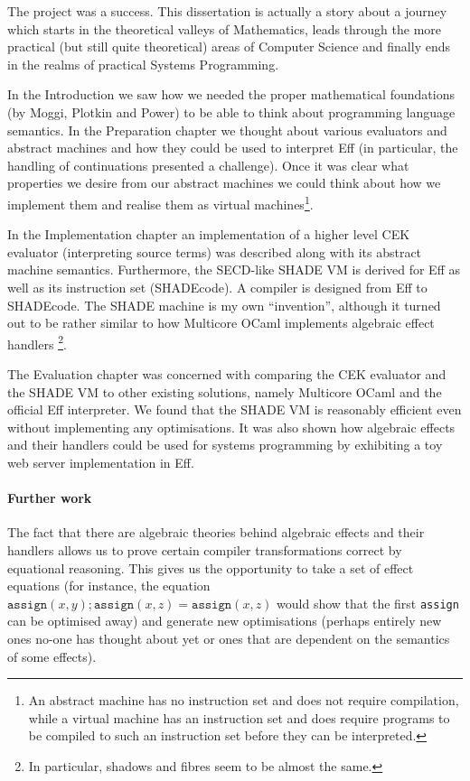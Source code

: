 \documentclass[class=article, crop=false]{standalone}
\begin{document}

The project was a success. This dissertation is actually a story about a journey
which starts in the theoretical valleys of Mathematics, leads through the more
practical (but still quite theoretical) areas of Computer Science and finally
ends in the realms of practical Systems Programming.

In the Introduction we saw how we needed the proper mathematical foundations
(by Moggi, Plotkin and Power) to be able to think about programming language
semantics. In the Preparation chapter we thought about various evaluators and
abstract machines and how they could be used to interpret Eff (in particular,
the handling of continuations presented a challenge). Once it was clear what
properties we desire from our abstract machines we could think about how we
implement them and realise them as virtual machines\footnote{An abstract machine
has no instruction set and does not require compilation, while a virtual machine
has an instruction set and does require programs to be compiled to such an
instruction set before they can be interpreted.}.

In the Implementation chapter an implementation of a higher level CEK evaluator
(interpreting source terms) was described along with its abstract machine
semantics. Furthermore, the SECD-like SHADE VM is derived for Eff as well as
its instruction set (SHADEcode). A compiler is designed from Eff to SHADEcode.
The SHADE machine is my own ``invention'', although it turned out to be rather
similar to how Multicore OCaml implements algebraic effect handlers
\footnote{In particular, shadows and fibres seem to be almost the same.}.

The Evaluation chapter was concerned with comparing the CEK evaluator and the
SHADE VM to other existing solutions, namely Multicore OCaml and the official
Eff interpreter. We found that the SHADE VM is reasonably efficient even without
implementing any optimisations. It was also shown how algebraic effects and
their handlers could be used for systems programming by exhibiting a toy web
server implementation in Eff.

\paragraph{Further work}

The fact that there are algebraic theories behind algebraic effects and their
handlers allows us to prove certain compiler transformations correct by
equational reasoning. This gives us the opportunity to take a set of effect
equations (for instance, the equation $\mathtt{assign}(x,y); \mathtt{assign}(x,z) =
\mathtt{assign}(x, z)$ would show that the first \texttt{assign} can be optimised
away) and generate new optimisations (perhaps entirely new ones no-one has
thought about yet or ones that are dependent on the semantics of some effects).
\end{document}
